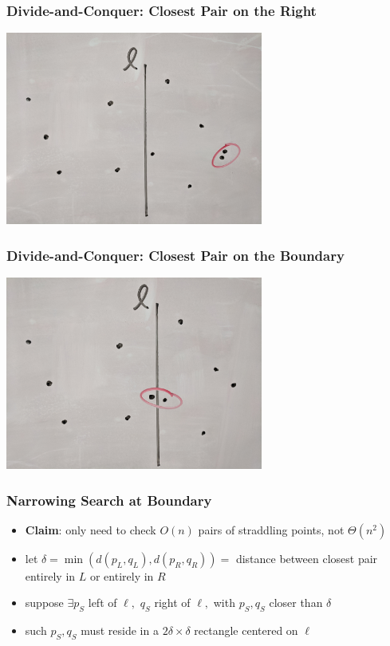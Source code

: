 \documentclass{beamer}
\begin{document}
\begin{frame} \frametitle{Divide-and-Conquer: Closest Pair on the Right}
  \begin{center}
    \includegraphics[height=2.5in]{closest-pair-on-right.jpg}
  \end{center}
\end{frame}

\begin{frame} \frametitle{Divide-and-Conquer: Closest Pair on the Boundary}
  \begin{center}
    \includegraphics[height=2.5in]{closest-pair-on-boundary.jpg}
  \end{center}
\end{frame}

\begin{frame} \frametitle{Narrowing Search at Boundary}
\begin{itemize}
  \item \textbf{Claim}: only need to check $O(n)$ pairs of straddling points, not $\Theta(n^2)$
  \item let $\delta = \min(d(p_L, q_L), d(p_R, q_R)) = $ distance between closest
    pair entirely in $L$ or entirely in $R$
  \item suppose $\exists p_S$ left of $\ell,$ $q_S$ right of $\ell,$ with $p_S, q_S$ closer than $\delta$
  \item such $p_S, q_S$ must reside in a $2\delta \times \delta$ rectangle centered on $\ell$
\end{itemize}
\end{frame}
\end{document}
